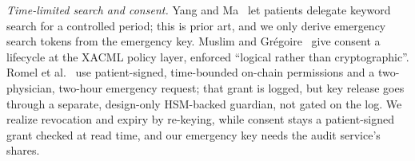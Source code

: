 \textit{Time-limited search and consent.}
Yang and Ma~\cite{yang2016timing} let patients delegate keyword search for a controlled period; this is prior art, and we only derive emergency search tokens from the emergency key.
Muslim and Gr\'egoire~\cite{muslim2026consent} give consent a lifecycle at the XACML policy layer, enforced ``logical rather than cryptographic''.
Romel et al.~\cite{romel2025patient} use patient-signed, time-bounded on-chain permissions and a two-physician, two-hour emergency request; that grant is logged, but key release goes through a separate, design-only HSM-backed guardian, not gated on the log.
We realize revocation and expiry by re-keying, while consent stays a patient-signed grant checked at read time, and our emergency key needs the audit service's shares.
